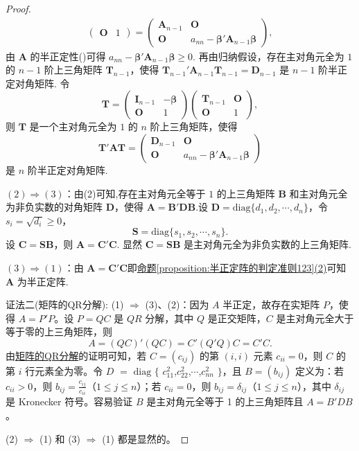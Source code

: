 \documentclass[../../main.tex]{subfiles}
\begin{document}
\begin{proof}
\begin{align*}
\begin{pmatrix}
\boldsymbol{O} & 1
\end{pmatrix}=
\begin{pmatrix}
\boldsymbol{A}_{n - 1} & \boldsymbol{O} \\
\boldsymbol{O} & a_{nn}-\boldsymbol{\beta}'\boldsymbol{A}_{n - 1}\boldsymbol{\beta}
\end{pmatrix},
\end{align*}
由 $\boldsymbol{A}$ 的半正定性()可得 $a_{nn}-\boldsymbol{\beta}'\boldsymbol{A}_{n - 1}\boldsymbol{\beta}\geqslant 0$. 再由归纳假设，存在主对角元全为 $1$ 的 $n - 1$ 阶上三角矩阵 $\boldsymbol{T}_{n - 1}$，使得 $\boldsymbol{T}_{n - 1}'\boldsymbol{A}_{n - 1}\boldsymbol{T}_{n - 1}=\boldsymbol{D}_{n - 1}$ 是 $n - 1$ 阶半正定对角矩阵. 令
\[
\boldsymbol{T}=\begin{pmatrix}
\boldsymbol{I}_{n - 1} & -\boldsymbol{\beta} \\
\boldsymbol{O} & 1
\end{pmatrix}
\begin{pmatrix}
\boldsymbol{T}_{n - 1} & \boldsymbol{O} \\
\boldsymbol{O} & 1
\end{pmatrix},
\]
则 $\boldsymbol{T}$ 是一个主对角元全为 $1$ 的 $n$ 阶上三角矩阵，使得
\[
\boldsymbol{T}'\boldsymbol{A}\boldsymbol{T}=\begin{pmatrix}
\boldsymbol{D}_{n - 1} & \boldsymbol{O} \\
\boldsymbol{O} & a_{nn}-\boldsymbol{\beta}'\boldsymbol{A}_{n - 1}\boldsymbol{\beta}
\end{pmatrix}
\]
是 $n$ 阶半正定对角矩阵.

$(2)\Rightarrow(3)$：由(2)可知,存在主对角元全等于 $1$ 的上三角矩阵 $\boldsymbol{B}$ 和主对角元全为非负实数的对角矩阵 $\boldsymbol{D}$，使得 $\boldsymbol{A}=\boldsymbol{B}'\boldsymbol{D}\boldsymbol{B}$.设 $\boldsymbol{D}=\mathrm{diag}\{d_1,d_2,\cdots,d_n\}$，令 $s_i = \sqrt{d_i}\geqslant 0$，
\[
\boldsymbol{S}=\mathrm{diag}\{s_1,s_2,\cdots,s_n\}.
\]
设 $\boldsymbol{C}=\boldsymbol{S}\boldsymbol{B}$，则 $\boldsymbol{A}=\boldsymbol{C}'\boldsymbol{C}$. 显然 $\boldsymbol{C}=\boldsymbol{S}\boldsymbol{B}$ 是主对角元全为非负实数的上三角矩阵.

$(3)\Rightarrow(1)$：由 $\boldsymbol{A}=\boldsymbol{C}'\boldsymbol{C}$即\hyperref[proposition:半正定阵的判定准则123]{命题\ref{proposition:半正定阵的判定准则123}(2)}可知 $\boldsymbol{A}$ 为半正定阵.

{\color{blue}证法二(矩阵的QR分解):}
(1) $\Rightarrow$ (3)、(2)：因为 $A$ 半正定，故存在实矩阵 $P$，使得 $A = P'P$。设 $P = QC$ 是 $QR$ 分解，其中 $Q$ 是正交矩阵，$C$ 是主对角元全大于等于零的上三角矩阵，则
\[
A=(QC)'(QC)=C'(Q'Q)C = C'C.
\]
由\hyperref[theorem:矩阵的QR分解]{矩阵的QR分解}的证明可知，若 $C = (c_{ij})$ 的第 $(i,i)$ 元素 $c_{ii}=0$，则 $C$ 的第 $i$ 行元素全为零。令 $D$ $=$ $\mathrm{diag}$ $\{$ $c_{11}^2$,$c_{22}^2$,$\cdots$,$c_{nn}^2$ $\}$，且 $B = (b_{ij})$ 定义为：若 $c_{ii}>0$，则 $b_{ij}=\frac{c_{ij}}{c_{ii}}$（$1\leqslant  j\leqslant  n$）；若 $c_{ii}=0$，则 $b_{ij}=\delta_{ij}$（$1\leqslant  j\leqslant  n$），其中 $\delta_{ij}$ 是 Kronecker 符号。容易验证 $B$ 是主对角元全等于 1 的上三角矩阵且 $A = B'DB$。

(2) $\Rightarrow$ (1) 和 (3) $\Rightarrow$ (1) 都是显然的。 
\end{proof}
\end{document}
